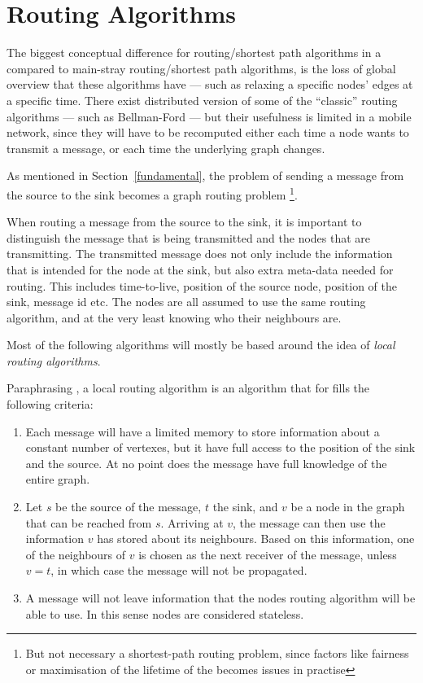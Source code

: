 \section{Routing Algorithms}

The biggest conceptual difference for routing/shortest path algorithms in a \manet compared to main-stray routing/shortest path algorithms, is the loss of global overview that these algorithms have --- such as relaxing a specific nodes' edges at a specific time. There exist distributed version of some of the ``classic'' routing algorithms --- such as Bellman-Ford --- but their usefulness is limited in a mobile network, since they will have to be recomputed either each time a node wants to transmit a message, or each time the underlying graph changes.

As mentioned in Section~\ref{fundamental}, the problem of sending a message from the source to the sink  becomes a graph routing problem \footnote{But not necessary a shortest-path routing problem, since factors like fairness or maximisation of the lifetime of the \manet becomes issues in practise}.

When routing a message from the source to the sink, it is important to distinguish the message that is being transmitted and the nodes that are transmitting. The transmitted message does not only include the information that is intended for the node at the sink, but also extra meta-data needed for routing. This includes time-to-live, position of the source node, position of the sink, message id etc. The nodes are all assumed to use the same routing algorithm, and at the very least knowing who their neighbours are.

Most of the following algorithms will mostly be based around the idea of \emph{local routing algorithms}. 

Paraphrasing \cite{compass}, a local routing algorithm is an algorithm that for fills the following criteria:
\begin{enumerate}
\item Each message will have a limited memory to store information about a constant number of vertexes, but it have full access to the position of the sink and the source. At no point does the message have full knowledge of the entire graph. 
\item Let $s$ be the source of the message, $t$ the sink, and $v$ be a node in the graph that can be reached from $s$. Arriving at $v$, the message can then use the information $v$ has stored about its neighbours. Based on this information, one of the neighbours of $v$ is chosen as the next receiver of the message, unless $v = t$, in which case the message will not be propagated.
\item A message will not leave information that the nodes routing algorithm will be able to use. In this sense nodes are considered stateless.\end{enumerate}

